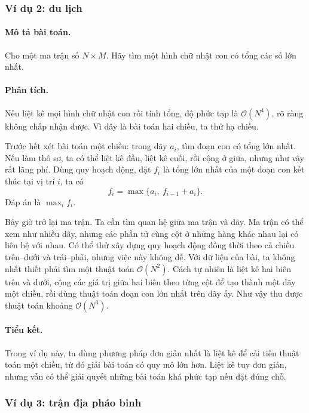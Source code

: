 \documentclass[11pt]{article}
\newcommand{\Oh}{\mathcal{O}}
\begin{document}
\subsubsection{Ví dụ 2: du lịch}

\paragraph{Mô tả bài toán.}
Cho một ma trận số $N\times M$. Hãy tìm một hình chữ nhật con có tổng các số
lớn nhất.

\paragraph{Phân tích.}
Nếu liệt kê mọi hình chữ nhật con rồi tính tổng, độ phức tạp là $\Oh(N^4)$,
rõ ràng không chấp nhận được. Vì đây là bài toán hai chiều, ta thử hạ chiều.

Trước hết xét bài toán một chiều: trong dãy $a_i$, tìm đoạn con có tổng lớn
nhất. Nếu làm thô sơ, ta có thể liệt kê đầu, liệt kê cuối, rồi cộng ở giữa,
nhưng như vậy rất lãng phí. Dùng quy hoạch động, đặt $f_i$ là tổng lớn nhất
của một đoạn con kết thúc tại vị trí $i$, ta có
\[
  f_i=\max\{a_i,\ f_{i-1}+a_i\}.
\]
Đáp án là $\max_i f_i$.

Bây giờ trở lại ma trận. Ta cần tìm quan hệ giữa ma trận và dãy. Ma trận có
thể xem như nhiều dãy, nhưng các phần tử cùng cột ở những hàng khác nhau lại
có liên hệ với nhau. Có thể thử xây dựng quy hoạch động đồng thời theo cả
chiều trên--dưới và trái--phải, nhưng việc này không dễ. Với dữ liệu của bài,
ta không nhất thiết phải tìm một thuật toán $\Oh(N^2)$. Cách tự nhiên là liệt
kê hai biên trên và dưới, cộng các giá trị giữa hai biên theo từng cột để tạo
thành một dãy một chiều, rồi dùng thuật toán đoạn con lớn nhất trên dãy ấy.
Như vậy thu được thuật toán khoảng $\Oh(N^3)$.

\paragraph{Tiểu kết.}
Trong ví dụ này, ta dùng phương pháp đơn giản nhất là liệt kê để cải tiến
thuật toán một chiều, từ đó giải bài toán có quy mô lớn hơn. Liệt kê tuy đơn
giản, nhưng vẫn có thể giải quyết những bài toán khá phức tạp nếu đặt đúng
chỗ.

\subsubsection{Ví dụ 3: trận địa pháo binh}
\end{document}
